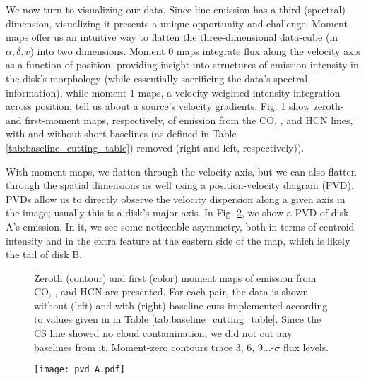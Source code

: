 We now turn to visualizing our data. Since line emission has a third (spectral) dimension, visualizing it presents a unique opportunity and challenge. Moment maps offer us an intuitive way to flatten the three-dimensional data-cube (in $\alpha, \delta, v$) into two dimensions. Moment 0 maps integrate flux along the velocity axis as a function of position, providing insight into structures of emission intensity in the disk's morphology (while essentially sacrificing the data's spectral information), while moment 1 maps, a velocity-weighted intensity integration across position, tell us about a source's velocity gradients. Fig. \ref{fig:baseline_cuts} show zeroth- and first-moment maps, respectively, of emission from the CO, \hco, and HCN lines, with and without short baselines (as defined in Table \ref{tab:baseline_cutting_table}) removed (right and left, respectively)).



With moment maps, we flatten through the velocity axis, but we can also flatten through the spatial dimensions as well using a position-velocity diagram (PVD). PVDs allow us to directly observe the velocity dispersion along a given axis in the image; usually this is a disk's major axis. In Fig. \ref{fig:pv_diag}, we show a PVD of disk A's \hco emission. In it, we see some noticeable asymmetry, both in terms of centroid intensity and in the extra feature at the eastern side of the map, which is likely the tail of disk B.


\begin{figure}[h]
  \hspace*{\fill}%
  \vfill%
  \vfill%
  \vfill%
  \hspace*{\fill}%
  \caption{Zeroth (contour) and first (color) moment maps of emission from CO, \hco, and HCN are presented. For each pair, the data is shown without (left) and with (right) baseline cuts implemented according to values given in in Table \ref{tab:baseline_cutting_table}. Since the CS line showed no cloud contamination, we did not cut any baselines from it. Moment-zero contours trace 3, 6, 9...-$\sigma$ flux levels.}
  \label{fig:baseline_cuts}
\end{figure}




\begin{figure}
  \centering
  \texttt{[image: pvd\_A.pdf]}
    \label{fig:pv_diag}
\end{figure}






